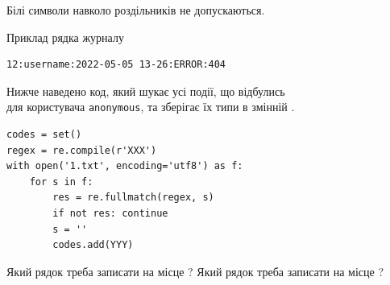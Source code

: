 \documentclass[12pt, ukrainian]{article}
\def\code#1{\Verb!#1!}
\begin{document}
{Білі символи навколо роздільників не допускаються.

Приклад рядка журналу



\begin{verbatim}
12:username:2022-05-05 13-26:ERROR:404
\end{verbatim}


Нижче наведено код, який шукає усі події, що відбулись\\ для користувача \code{anonymous}, та зберігає їх типи в змінній .



\begin{verbatim}
codes = set()
regex = re.compile(r'XXX')
with open('1.txt', encoding='utf8') as f:
    for s in f:
        res = re.fullmatch(regex, s)
        if not res: continue
        s = ''
        codes.add(YYY)
\end{verbatim}



Який рядок треба записати на місце  ?
Який рядок треба записати на місце  ?\par

}
\newpage
\end{document}
